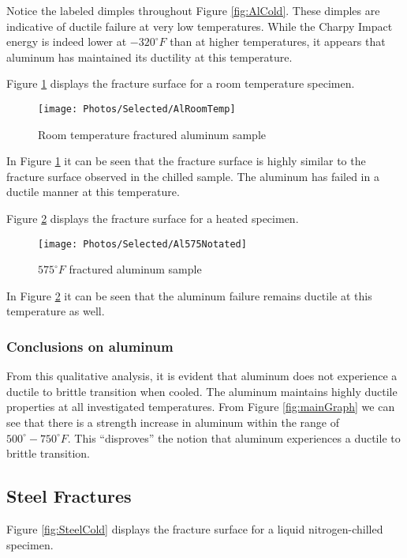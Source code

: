 \documentclass{article}
\begin{document}
Notice the labeled dimples throughout Figure \ref{fig:AlCold}. These dimples are indicative of ductile failure at very low temperatures. While the Charpy Impact energy is indeed lower at $-320^\circ F$ than at higher temperatures, it appears that aluminum has maintained its ductility at this temperature.

Figure \ref{fig:AlRoomTemp} displays the fracture surface for a room temperature specimen.

\begin{figure}[H]
\centering
\texttt{[image: Photos/Selected/AlRoomTemp]}
\caption{Room temperature fractured aluminum sample}
\label{fig:AlRoomTemp}
\end{figure}

In Figure \ref{fig:AlRoomTemp} it can be seen that the fracture surface is highly similar to the fracture surface observed in the chilled sample. The aluminum has failed in a ductile manner at this temperature.

Figure \ref{fig:AlHotFrac} displays the fracture surface for a heated specimen.

\begin{figure}[H]
\centering
\texttt{[image: Photos/Selected/Al575Notated]}
\caption{$575^\circ F$ fractured aluminum sample}
\label{fig:AlHotFrac}
\end{figure}

In Figure \ref{fig:AlHotFrac} it can be seen that the aluminum failure remains ductile at this temperature as well.

\subsubsection*{Conclusions on aluminum}
From this qualitative analysis, it is evident that aluminum does not experience a ductile to brittle transition when cooled. The aluminum maintains highly ductile properties at all investigated temperatures. From Figure \ref{fig:mainGraph} we can see that there is a strength increase in aluminum within the range of $500^\circ - 750^\circ F$. This ``disproves'' the notion that aluminum experiences a ductile to brittle transition.

\subsection{Steel Fractures}
Figure \ref{fig:SteelCold} displays the fracture surface for a liquid nitrogen-chilled specimen.
\end{document}
